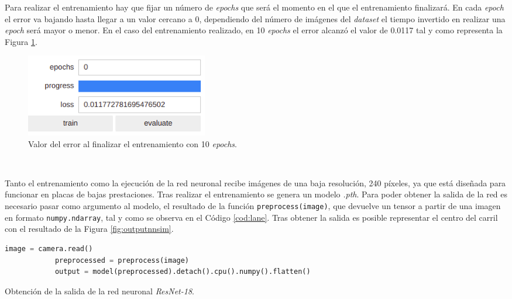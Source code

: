 Para realizar el entrenamiento hay que fijar un número de \textit{epochs} que será el momento en el que el entrenamiento finalizará. En cada \textit{epoch} el error va bajando
hasta llegar a un valor cercano a 0, dependiendo del número de imágenes del \textit{dataset} el tiempo invertido en realizar una \textit{epoch} será mayor o menor. En el caso del
entrenamiento realizado, en 10 \textit{epochs} el error alcanzó el valor de 0.0117 tal y como representa la Figura \ref{fig:epochsimulator}.\\

\begin{figure} [h!]
	\begin{center}
		\includegraphics[width=8cm]{figs/epochSimulator}
	\end{center}
	\caption{Valor del error al finalizar el entrenamiento con 10 \textit{epochs}.}
	\label{fig:epochsimulator}
\end{figure}\

Tanto el entrenamiento como la ejecución de la red neuronal recibe imágenes de una baja resolución, 240 píxeles, ya que está diseñada para funcionar en placas de bajas
prestaciones. Tras realizar el entrenamiento se genera un modelo \textit{.pth}. Para poder obtener la salida de la red es necesario pasar como argumento al modelo, el resultado de
la función \verb|preprocess(image)|, que devuelve un tensor a partir de una imagen en formato \verb|numpy.ndarray|, tal y como se observa en el Código \ref{cod:lane}. Tras obtener
la salida es posible representar el centro del carril con el resultado de la Figura \ref{fig:outputnnsim}.\\

\begin{code}[h]
	\begin{lstlisting}[language=Python]
			image = camera.read()
    		preprocessed = preprocess(image)
    		output = model(preprocessed).detach().cpu().numpy().flatten()
	\end{lstlisting}
	\caption[Obtención de la salida de la red neuronal \textit{ResNet-18}.]{Obtención de la salida de la red neuronal \textit{ResNet-18}.}
	\label{cod:lane}
\end{code}

